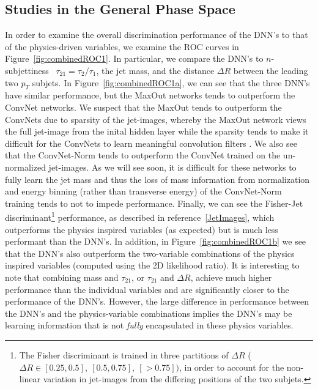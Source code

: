 
\subsection{Studies in the General Phase Space} %
\label{sub:coarse_studies}

In order to examine the overall discrimination performance of the DNN's to that of the physics-driven variables, we examine the ROC curves in Figure~\ref{fig:combinedROC1}. In particular, we compare the DNN's to $n$-subjettiness~\cite{nsub} $\tau_{21} = \tau_{2}/\tau_{1}$, the jet mass, and the distance $\Delta R$ between the leading two $p_{T}$ subjets.  In Figure~\ref{fig:combinedROC1a}, we can see that the three DNN's have similar performance, but the MaxOut networks tends to outperform the ConvNet networks.  We suspect that the MaxOut tends to outperform the ConvNets due to sparsity of the jet-images, whereby the MaxOut network views the full jet-image from the inital hidden layer while the sparsity tends to make it difficult for the ConvNets to learn meaningful convolution filters .  We also see that the ConvNet-Norm tends to outperform the ConvNet trained on the un-normalized jet-images.  As we will see soon,  it is difficult for these networks to fully learn the jet mass and thus the loss of mass information from normalization and energy  binning (rather than transverse energy) of the ConvNet-Norm training tends to not to impede performance.   Finally, we can see the Fisher-Jet discriminant\footnote{The Fisher discriminant is trained in three partitions of $\Delta  R$ ($\Delta R \in [0.25, 0.5],\ [0.5, 0.75],\ [>0.75])$, in order to account for the non-linear variation in jet-images from the differing positions of the two subjets.} performance, as described in reference~\ref{JetImages}, which outperforms the physics inspired variables (as expected) but is much less performant than the DNN's. In addition, in Figure~\ref{fig:combinedROC1b} we see that the DNN's also outperform the two-variable combinations of the physics inspired variables (computed using the 2D likelihood ratio).   It is interesting to note that combining mass and $\tau_{21}$, or $\tau_{21}$ and $\Delta R$, achieve much higher performance than the individual variables and are significantly closer to the performance of the DNN's.  However, the large difference in performance between the DNN's and the physics-variable combinations implies the DNN's may be learning information that is not \emph{fully} encapsulated in these physics variables.
